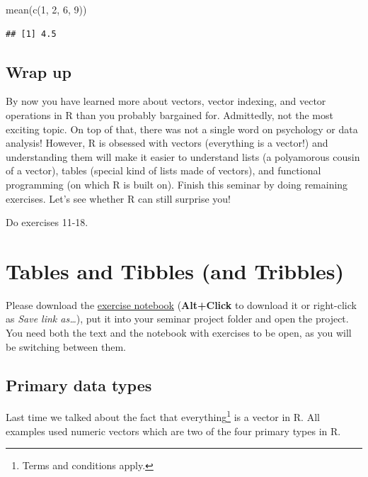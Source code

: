 \documentclass[
]{book}
\newenvironment{Shaded}{\begin{snugshade}}{\end{snugshade}}
\newcommand{\DecValTok}[1]{\textcolor[rgb]{0.00,0.00,0.81}{#1}}
\newcommand{\FunctionTok}[1]{\textcolor[rgb]{0.00,0.00,0.00}{#1}}
\newcommand{\NormalTok}[1]{#1}
\begin{document}
\begin{Shaded}
\begin{Highlighting}[]
\FunctionTok{mean}\NormalTok{(}\FunctionTok{c}\NormalTok{(}\DecValTok{1}\NormalTok{, }\DecValTok{2}\NormalTok{, }\DecValTok{6}\NormalTok{, }\DecValTok{9}\NormalTok{))}
\end{Highlighting}
\end{Shaded}

\begin{verbatim}
## [1] 4.5
\end{verbatim}

\hypertarget{wrap-up}{%
\section{Wrap up}\label{wrap-up}}

By now you have learned more about vectors, vector indexing, and vector operations in R than you probably bargained for. Admittedly, not the most exciting topic. On top of that, there was not a single word on psychology or data analysis! However, R is obsessed with vectors (everything is a vector!) and understanding them will make it easier to understand lists (a polyamorous cousin of a vector), tables (special kind of lists made of vectors), and functional programming (on which R is built on). Finish this seminar by doing remaining exercises. Let's see whether R can still surprise you!

Do exercises 11-18.

\hypertarget{tables}{%
\chapter{Tables and Tibbles (and Tribbles)}\label{tables}}

Please download the \href{notebooks/Seminar\%2003\%20-\%20Tables.Rmd}{exercise notebook} (\textbf{Alt+Click} to download it or right-click as \emph{Save link as\ldots{}}), put it into your seminar project folder and open the project. You need both the text and the notebook with exercises to be open, as you will be switching between them.

\hypertarget{primary-types}{%
\section{Primary data types}\label{primary-types}}

Last time we talked about the fact that everything\footnote{Terms and conditions apply.} is a vector in R. All examples used numeric vectors which are two of the four primary types in R.
\end{document}
